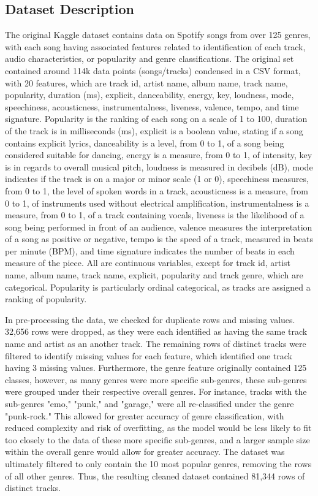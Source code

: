\documentclass[times, twocolumn]{article}
\begin{document}
\subsection{Dataset Description}
The original Kaggle dataset contains data on Spotify songs from over 125 genres, with each song having associated features related to identification of each track, audio characteristics, or popularity and genre classifications. The original set contained around 114k data points (songs/tracks) condensed in a CSV format, with 20 features, which are track id, artist name, album name, track name, popularity, duration (ms), explicit, danceability, energy, key, loudness, mode, speechiness, acousticness, instrumentalness, liveness, valence, tempo, and time signature. Popularity is the ranking of each song on a scale of 1 to 100, duration of the track is in milliseconds (ms), explicit is a boolean value, stating if a song contains explicit lyrics, danceability is a level, from 0 to 1, of a song being considered suitable for dancing, energy is a measure, from 0 to 1, of intensity, key is in regards to overall musical pitch, loudness is measured in decibels (dB), mode indicates if the track is on a major or minor scale (1 or 0), speechiness measures, from 0 to 1, the level of spoken words in a track, acousticness is a measure, from 0 to 1, of instruments used without electrical amplification, instrumentalness is a measure, from 0 to 1, of a track containing vocals, liveness is the likelihood of a song being performed in front of an audience, valence measures the interpretation of a song as positive or negative, tempo is the speed of a track, measured in beats per minute (BPM), and time signature indicates the number of beats in each measure of the piece. All are continuous variables, except for track id, artist name, album name, track name, explicit, popularity and track genre, which are categorical. Popularity is particularly ordinal categorical, as tracks are assigned a ranking of popularity. 

In pre-processing the data, we checked for duplicate rows and missing values. 32,656 rows were dropped, as they were each identified as having the same track name and artist as an another track. The remaining rows of distinct tracks were filtered to identify missing values for each feature, which identified one track having 3 missing values. Furthermore, the genre feature originally contained 125 classes, however, as many genres were more specific sub-genres, these sub-genres were grouped under their respective overall genres. For instance, tracks with the sub-genres "emo," "punk," and "garage," were all re-classified under the genre "punk-rock." This allowed for greater accuracy of genre classification, with reduced complexity and risk of overfitting, as the model would be less likely to fit too closely to the data of these more specific sub-genres, and a larger sample size within the overall genre would allow for greater accuracy. The dataset was ultimately filtered to only contain the 10 most popular genres, removing the rows of all other genres. Thus, the resulting cleaned dataset contained 81,344 rows of distinct tracks.
\end{document}
